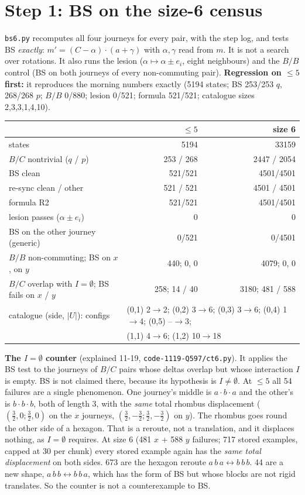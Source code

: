 \documentclass[11pt]{article}
\theoremstyle{definition}\newtheorem{definition}[theorem]{Definition}\newtheorem{remark}[theorem]{Remark}
\begin{document}
\section{Step 1: BS on the size-6 census}\label{sec:bs6}
\texttt{bs6.py} recomputes all four journeys for every pair, with the step log, and tests BS \emph{exactly}: $m'=(C-\alpha)\cdot(a+\gamma)$ with $\alpha,\gamma$ read from $m$.
It is not a search over rotations. It also runs the lesion ($\alpha\mapsto\alpha\pm e_i$, eight neighbours) and the $B/B$ control (BS on both journeys of every non-commuting pair).
\textbf{Regression on $\le5$ first:} it reproduces the morning numbers exactly (5194 states; BS 253/253 $q$, 268/268 $p$; $B/B$ 0/880; lesion 0/521; formula 521/521; catalogue sizes 2,3,3,1,4,10).
\begin{center}\begin{tabular}{lrr}\toprule
& $\le5$ & size 6\\\midrule
states & 5194 & 33159\\
$B/C$ nontrivial ($q$ / $p$) & 253 / 268 & 2447 / 2054\\
BS clean & 521/521 & 4501/4501\\
re-sync clean / other & 521 / 521 & 4501 / 4501\\
formula R2 & 521/521 & 4501/4501\\
lesion passes ($\alpha\pm e_i$) & 0 & 0\\
BS on the other journey (generic) & 0/521 & 0/4501\\
$B/B$ non-commuting; BS on $x$, on $y$ & 440; 0, 0 & 4079; 0, 0\\
$B/C$ overlap with $I=\emptyset$; BS fails on $x$ / $y$ & 258; 14 / 40 & 3180; 481 / 588\\\midrule
catalogue (side, $|U|$): configs & \multicolumn{2}{l}{(0,1) 2$\to$2; (0,2) 3$\to$6; (0,3) 3$\to$6; (0,4) 1$\to$4; (0,5) --$\to$3;}\\
& \multicolumn{2}{l}{(1,1) 4$\to$6; (1,2) 10$\to$18}\\\bottomrule
\end{tabular}\end{center}
\textbf{The $I=\emptyset$ counter} (explained 11-19, \texttt{code-1119-Q597/ct6.py}). It applies the BS test to the journeys of $B/C$ pairs whose deltas overlap but whose interaction $I$ is empty. BS is not claimed there, because its hypothesis is $I\neq\emptyset$.
At $\le5$ all 54 failures are a single phenomenon. One journey's middle is $a\cdot b\cdot a$ and the other's is $b\cdot b\cdot b$, both of length 3, with the \emph{same} total rhombus displacement ($(\tfrac32,0;\tfrac32,0)$ on the $x$ journeys, $(\tfrac32,-\tfrac32;\tfrac32,-\tfrac32)$ on $y$).
The rhombus goes round the other side of a hexagon. That is a reroute, not a translation, and it displaces nothing, as $I=\emptyset$ requires. At size 6 (481 $x$ + 588 $y$ failures; 717 stored examples, capped at 30 per chunk) every stored example again has the \emph{same total displacement} on both sides. 673 are the hexagon reroute $a\,b\,a\leftrightarrow b\,b\,b$. 44 are a new shape, $a\,b\,b\leftrightarrow b\,b\,a$, which has the form of BS but whose blocks are not rigid translates. So the counter is not a counterexample to BS.
\end{document}
